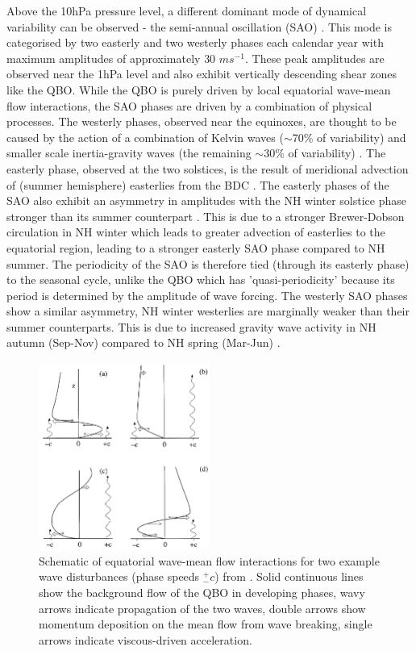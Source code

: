 Above the 10hPa pressure level, a different dominant mode of dynamical variability can be observed - the semi-annual oscillation (SAO) \citep{garciaClimatology1997}. This mode is categorised by two easterly and two westerly phases each calendar year with maximum amplitudes of approximately 30 $ms^{-1}$. These peak amplitudes are observed near the 1hPa level and also exhibit vertically descending shear zones like the QBO. While the QBO is purely driven by local equatorial wave-mean flow interactions, the SAO phases are driven by a combination of physical processes. The westerly phases, observed near the equinoxes, are thought to be caused by the action of a combination of Kelvin waves ($\sim$70\% of variability) and smaller scale inertia-gravity waves (the remaining $\sim$30\% of variability) \citep{dunkertonRole1979,hitchmanEstimation1988}. The easterly phase, observed at the two solstices, is the result of meridional advection of (summer hemisphere) easterlies from the BDC \citep{holtonNumerical1980}. The easterly phases of the SAO also exhibit an asymmetry in amplitudes with the NH winter solstice phase stronger than its summer counterpart \citep{dunkertonRole1979}. This is due to a stronger Brewer-Dobson circulation in NH winter which leads to greater advection of easterlies to the equatorial region, leading to a stronger easterly SAO phase compared to NH summer. The periodicity of the SAO is therefore tied (through its easterly phase) to the seasonal cycle, unlike the QBO which has 'quasi-periodicity' because its period is determined by the amplitude of wave forcing. The westerly SAO phases show a similar asymmetry, NH winter westerlies are marginally weaker than their summer counterparts. This is due to increased gravity wave activity in NH autumn (Sep-Nov) compared to NH spring (Mar-Jun) \citep{rayAnalysis1998}. 

\begin{figure}[h!]
\centering
    \includegraphics[width=0.5\textwidth]{Figures/Figures-background/Schematic_of_QBO_waves.png}
    \caption[Schematic of equatorial wave-mean flow interactions.]{Schematic of equatorial wave-mean flow interactions for two example wave disturbances (phase speeds $^+_- c$) from \cite{plumbQuasibiennial1984}. Solid continuous lines show the background flow of the QBO in developing phases, wavy arrows indicate propagation of the two waves, double arrows show momentum deposition on the mean flow from wave breaking, single arrows indicate viscous-driven acceleration.}
    \label{fig:QBO_wave_schematic}
\centering
\end{figure}

